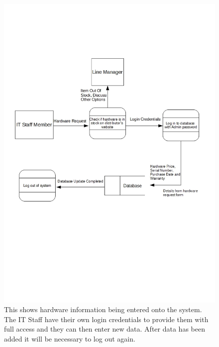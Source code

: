 \begin{figure}[H]
\includegraphics[width=\textwidth]{DFDLogin.jpg}
\caption{This shows hardware information being entered onto the system. The IT Staff have their own login credentials to provide them with full access and they can then enter new data. After data has been added it will be necessary to log out again. } \label{Page1Interview}
\end{figure}

